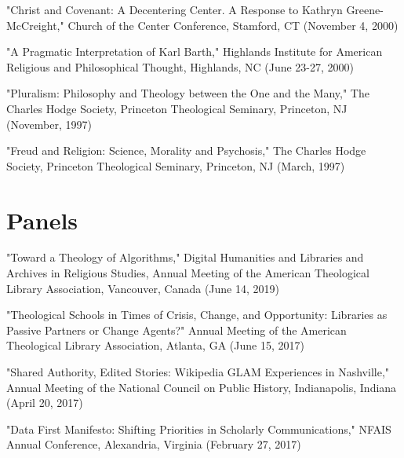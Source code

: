 \documentclass[10pt]{res} %
\begin{document}
\begin{resume}
\begin{hangparas}{.25in}{1}"Christ and Covenant: A Decentering Center. A Response to Kathryn Greene-McCreight," Church of the Center Conference, Stamford, CT (November 4, 2000)\end{hangparas}

\begin{hangparas}{.25in}{1}"A Pragmatic Interpretation of Karl Barth," Highlands Institute for American Religious and Philosophical Thought, Highlands, NC (June 23-27, 2000)\end{hangparas}

\begin{hangparas}{.25in}{1}"Pluralism: Philosophy and Theology between the One and the Many," The Charles Hodge Society, Princeton Theological Seminary, Princeton, NJ (November, 1997)\end{hangparas}

\begin{hangparas}{.25in}{1}"Freud and Religion: Science, Morality and Psychosis," The Charles Hodge Society, Princeton Theological Seminary, Princeton, NJ (March, 1997)\end{hangparas}

\section{Panels}

\begin{hangparas}{.25in}{1}"Toward a Theology of Algorithms," Digital Humanities and Libraries and Archives in Religious Studies, Annual Meeting of the American Theological Library Association, Vancouver, Canada (June 14, 2019)\end{hangparas}

\begin{hangparas}{.25in}{1}"Theological Schools in Times of Crisis, Change, and Opportunity: Libraries as Passive Partners or Change Agents?" Annual Meeting of the American Theological Library Association, Atlanta, GA (June 15, 2017)\end{hangparas}

\begin{hangparas}{.25in}{1}"Shared Authority, Edited Stories: Wikipedia GLAM Experiences in Nashville," Annual Meeting of the National Council on Public History, Indianapolis, Indiana (April 20, 2017)\end{hangparas}

\begin{hangparas}{.25in}{1}"Data First Manifesto: Shifting Priorities in Scholarly Communications," NFAIS Annual Conference, Alexandria, Virginia (February 27, 2017)\end{hangparas}


\end{resume}
\end{document}
